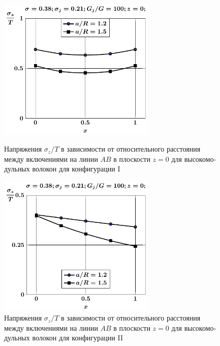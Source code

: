 \begin{russian}
\begin{figure}[h!]
\centering\footnotesize
\parbox[b]{7.5cm}{\centering\includegraphics[width=7.5cm]{inc2a-a-h10-r10-g100-z0-sig_z.pdf}
\caption{Напряжения $\sigma_z/T$ в зависимости от относительного расстояния между включениями на линии $AB$ в плоскости $z=0$ для высокомодульных волокон для конфигурации I
\label{f:7:103}}}\hfil\hfil
\parbox[b]{7.5cm}{\centering\includegraphics[width=7.5cm]{inc2b-a-h10-r10-g100-z0-sig_z.pdf}
\caption{Напряжения $\sigma_z/T$ в зависимости от относительного расстояния между включениями на линии $AB$ в плоскости $z=0$ для высокомодульных волокон для конфигурации II
\label{f:7:104}}}
\end{figure}


\end{russian}
